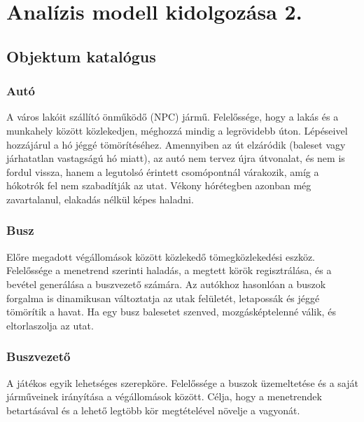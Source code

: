 \chapter{Analízis modell kidolgozása 2.}


\section{Objektum katalógus}

\subsection{Autó}
\par{A város lakóit szállító önműködő (NPC) jármű. Felelőssége, hogy a lakás és a munkahely között közlekedjen, méghozzá mindig a legrövidebb úton. Lépéseivel hozzájárul a hó jéggé tömörítéséhez. Amennyiben az út elzáródik (baleset vagy járhatatlan vastagságú hó miatt), az autó nem tervez újra útvonalat, és nem is fordul vissza, hanem a legutolsó érintett csomópontnál várakozik, amíg a hókotrók fel nem szabadítják az utat. Vékony hórétegben azonban még zavartalanul, elakadás nélkül képes haladni.}

\subsection{Busz}
\par{Előre megadott végállomások között közlekedő tömegközlekedési eszköz. Felelőssége a menetrend szerinti haladás, a megtett körök regisztrálása, és a bevétel generálása a buszvezető számára. Az autókhoz hasonlóan a buszok forgalma is dinamikusan változtatja az utak felületét, letapossák és jéggé tömörítik a havat. Ha egy busz balesetet szenved, mozgásképtelenné válik, és eltorlaszolja az utat.}

\subsection{Buszvezető}
\par{A játékos egyik lehetséges szerepköre. Felelőssége a buszok üzemeltetése és a saját járműveinek irányítása a végállomások között. Célja, hogy a menetrendek betartásával és a lehető legtöbb kör megtételével növelje a vagyonát.}

